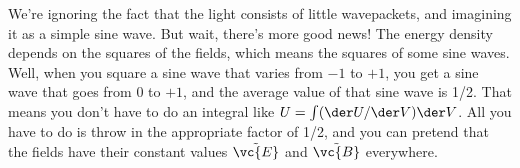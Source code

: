 We're ignoring the fact that the light consists of little
wavepackets, and imagining it as a simple sine wave. But wait, there's
more good news! The energy density depends on the squares of the fields,
which means the squares of some sine waves. Well, when you square a sine
wave that varies from $-1$ to $+1$, you get a sine wave that goes from
0 to $+1$, and the average value of that sine wave is 1/2. That means
you don't have to do an integral like $U=\int (\der U/\der V)\der V$.
All you have to do is throw in the appropriate factor of 1/2, and you
can pretend that the fields have their constant values
$\tilde{\vc{E}}$ and $\tilde{\vc{B}}$ everywhere.
